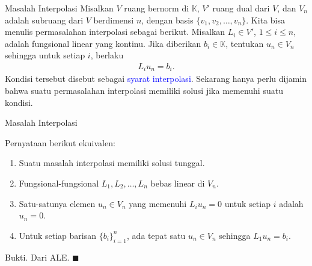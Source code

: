 \documentclass[xcolor={dvipsnames}, 9pt]{beamer}
\newcommand{\emp}[1]{\textcolor{Blue}{#1}}
\begin{document}
    \begin{frame}{Masalah Interpolasi}
        Misalkan $V$ ruang bernorm di $\mathbb{K}$, $V'$ ruang dual dari $V$, dan $V_n$ adalah subruang dari $V$ berdimensi $n$, dengan basis $\{v_1,v_2,\dots,v_n\}$. \newline
        Kita bisa menulis permasalahan interpolasi sebagai berikut. Misalkan $L_i\in V'$, $1\leq i\leq n$, adalah fungsional linear yang kontinu. Jika diberikan $b_i\in\mathbb{K}$, tentukan $u_n\in V_n$ sehingga untuk setiap $i$, berlaku
        \begin{align*}
            L_iu_n = b_i.
        \end{align*}
        Kondisi tersebut disebut sebagai \emp{syarat interpolasi}. Sekarang hanya perlu dijamin bahwa suatu permasalahan interpolasi memiliki solusi jika memenuhi suatu kondisi.
    \end{frame}
    \begin{frame}{Masalah Interpolasi}
        \begin{theorem}
            Pernyataan berikut ekuivalen:
            \begin{enumerate}
                \item Suatu masalah interpolasi memiliki solusi tunggal.
                \item Fungsional-fungsional $L_1,L_2,\dots,L_n$ bebas linear di $V_n$.
                \item Satu-satunya elemen $u_n\in V_n$ yang memenuhi $L_iu_n=0$ untuk setiap $i$ adalah $u_n=0$.
                \item Untuk setiap barisan $\{b_i\}_{i=1}^n$, ada tepat satu $u_n\in V_n$ sehingga $L_1u_n=b_i$.
            \end{enumerate}
        \end{theorem}
        Bukti. Dari ALE. $\blacksquare$
    \end{frame}
\end{document}
